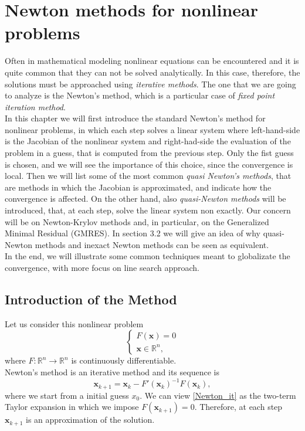 \chapter{Newton methods for nonlinear problems}
Often in mathematical modeling nonlinear equations can be encountered and it is quite common that they can not be solved analytically. In this case, therefore, the solutions must be approached using \textit{iterative methods}.
The one that we are going to analyze is the Newton's method, which is a particular case of \textit{fixed point iteration method}. \\
In this chapter we will first introduce the standard Newton's method for nonlinear problems, in which each step solves a linear system where left-hand-side is the Jacobian of the nonlinear system and right-had-side the evaluation of the problem in a guess, that is computed from the previous step. Only the fist guess is chosen, and we will see the importance of this choice, since the convergence is local. Then we will list some of the most common \textit{quasi Newton's methods}, that are methods in which the Jacobian is approximated, and indicate how the convergence is affected. On the other hand, also \textit{quasi-Newton methods} will be introduced, that, at each step, solve the linear system non exactly. Our concern will be on Newton-Krylov methods and, in particular, on the Generalized Minimal Residual (GMRES). In section 3.2 we will give an idea of why quasi-Newton methods and inexact Newton methods can be seen as equivalent. \\
In the end, we will illustrate some common techniques meant to globalizate the convergence, with more focus on line search approach. 
 
\section{Introduction of the Method}
Let us consider this nonlinear problem 
\begin{equation*}
\begin{cases}
F(\textbf{x}) = 0\\\textbf{x} \in \mathbb{R}^n,
\end{cases}
\end{equation*}
where $F: \mathbb{R}^{n} \rightarrow \mathbb{R}^{n}$ is continuously differentiable.\\
Newton's method is an iterative method and its sequence is
\begin{equation}
{\textbf{x}}_{k+1} = {\textbf{x}}_{k} - F'({\textbf{x}}_{k})^{-1} F({\textbf{x}}_{k}), 
\label{Newton_it}
\end{equation}
where we start from a initial guess ${x}_{0}$. We can view \eqref{Newton_it} as the two-term Taylor expansion in which we impose $F({\textbf{x}}_{k+1})=0$.  Therefore, at each step $ \textbf{x}_{k+1} $ is an approximation of the solution.\\


